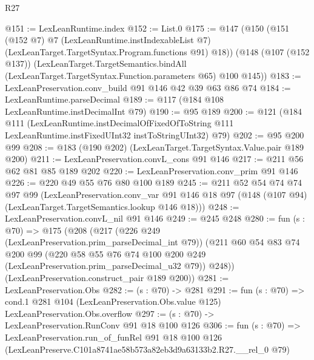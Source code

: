 \begin{lexlean}{R27}
\begin{coremodule}
@151 := LexLeanRuntime.index
@152 := List.{0}
@175 := @147
    (@150
      (@151
        (@152 @7)
        @7
        (LexLeanRuntime.instIndexableList @7)
        (LexLeanTarget.TargetSyntax.Program.functions @91)
        @18))
    (@148
      (@107 (@152 @137))
      (LexLeanTarget.TargetSemantics.bindAll
        (LexLeanTarget.TargetSyntax.Function.parameters @65)
        @100
        @145))
@183 := LexLeanPreservation.conv_build @91 @146 @42 @39 @63 @86 @74
@184 := LexLeanRuntime.parseDecimal
@189 := @117 (@184 @108 LexLeanRuntime.instDecimalInt @79)
@190 := @95 @189
@200 := @121
    (@184
      @111
      (LexLeanRuntime.instDecimalOfFixedOfToString
        @111
        LexLeanRuntime.instFixedUInt32
        instToStringUInt32)
      @79)
@202 := @95 @200 @99
@208 := @183 (@190 @202) (LexLeanTarget.TargetSyntax.Value.pair @189 @200)
@211 := LexLeanPreservation.convL_cons @91 @146
@217 := @211 @56 @62 @81 @85 @189 @202
@220 := LexLeanPreservation.conv_prim @91 @146
@226 := @220 @49 @55 @76 @80 @100 @189
@245 := @211
    @52
    @54
    @74
    @74
    @97
    @99
    (LexLeanPreservation.conv_var
      @91
      @146
      @18
      @97
      (@148 (@107 @94) (LexLeanTarget.TargetSemantics.lookup @146 @18)))
@248 := LexLeanPreservation.convL_nil @91 @146
@249 := @245 @248
@280 := fun (s : @70) =>
  @175
    (@208
      (@217
        (@226 @249 (LexLeanPreservation.prim_parseDecimal_int @79))
        (@211
          @60
          @54
          @83
          @74
          @200
          @99
          (@220 @58 @55 @76 @74 @100 @200 @249 (LexLeanPreservation.prim_parseDecimal_u32 @79))
          @248))
      (LexLeanPreservation.construct_pair @189 @200))
@281 := LexLeanPreservation.Obs
@282 := (s : @70) -> @281
@291 := fun (s : @70) =>
  cond.{1} @281 @104 (LexLeanPreservation.Obs.value @125) LexLeanPreservation.Obs.overflow
@297 := (s : @70) -> LexLeanPreservation.RunConv @91 @18 @100 @126
@306 := fun (s : @70) =>
  LexLeanPreservation.run_of_funRel
    @91
    @18
    @100
    @126
    (LexLeanPreserve.C101a8741ae58b573a82eb3d9a63133b2.R27.__rel_0 @79)
\end{coremodule}
\end{lexlean}
